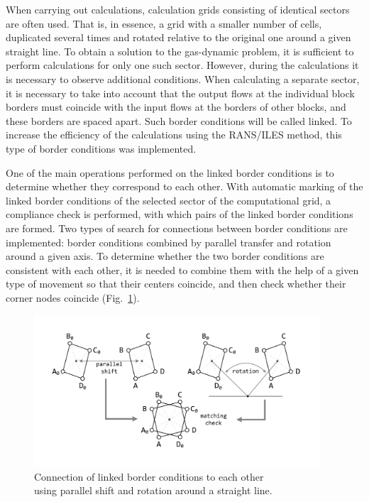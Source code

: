\documentclass[
11pt,%
tightenlines,%
twoside,%
onecolumn,%
nofloats,%
nobibnotes,%
nofootinbib,%
superscriptaddress,%
noshowpacs,%
centertags]%
{revtex4}
\begin{document}
When carrying out calculations, calculation grids consisting of identical sectors are often used.
That is, in essence, a grid with a smaller number of cells, duplicated several times and rotated relative to the original one around a given straight line.
To obtain a solution to the gas-dynamic problem, it is sufficient to perform calculations for only one such sector.
However, during the calculations it is necessary to observe additional conditions.
When calculating a separate sector, it is necessary to take into account that the output flows at the individual block borders must coincide with the input flows at the borders of other blocks, and these borders are spaced apart.
Such border conditions will be called linked.
To increase the efficiency of the calculations using the RANS/ILES method, this type of border conditions was implemented.

One of the main operations performed on the linked border conditions is to determine whether they correspond to each other.
With automatic marking of the linked border conditions of the selected sector of the computational grid, a compliance check is performed, with which pairs of the linked border conditions are formed.
Two types of search for connections between border conditions are implemented: border conditions combined by parallel transfer and rotation around a given axis.
To determine whether the two border conditions are consistent with each other, it is needed to combine them with the help of a given type of movement so that their centers coincide, and then check whether their corner nodes coincide (Fig.~\ref{fig:match3}).

\begin{figure}[h]
\setcaptionmargin{5mm}
\onelinecaptionsfalse
\includegraphics[width=0.95\textwidth]{pics/match3.pdf}
\caption{Connection of linked border conditions to each other \\ using parallel shift and rotation around a straight line.}
\label{fig:match3}
\end{figure}
\end{document}
